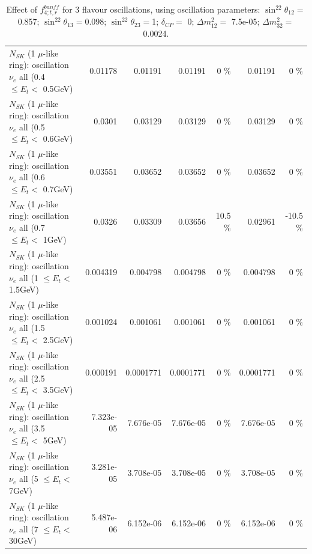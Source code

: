 \begin{table}
\begin{tabular}{| l | r | r | r  r | r  r |}
$N_{SK}$ (1 $\mu$-like ring): oscillation $\nu_{e}$ all (0.4 $\leq E_{t} <$ 0.5GeV) &         0.01178 &         0.01191 &         0.01191 &        0 \%  &         0.01191 &        0 \%  \\ 
$N_{SK}$ (1 $\mu$-like ring): oscillation $\nu_{e}$ all (0.5 $\leq E_{t} <$ 0.6GeV) &          0.0301 &         0.03129 &         0.03129 &        0 \%  &         0.03129 &        0 \%  \\ 
$N_{SK}$ (1 $\mu$-like ring): oscillation $\nu_{e}$ all (0.6 $\leq E_{t} <$ 0.7GeV) &         0.03551 &         0.03652 &         0.03652 &        0 \%  &         0.03652 &        0 \%  \\ 
$N_{SK}$ (1 $\mu$-like ring): oscillation $\nu_{e}$ all (0.7 $\leq E_{t} <$ 1GeV) &          0.0326 &         0.03309 &         0.03656 &     10.5 \%  &         0.02961 &    -10.5 \%  \\ 
$N_{SK}$ (1 $\mu$-like ring): oscillation $\nu_{e}$ all (1 $\leq E_{t} <$ 1.5GeV) &        0.004319 &        0.004798 &        0.004798 &        0 \%  &        0.004798 &        0 \%  \\ 
$N_{SK}$ (1 $\mu$-like ring): oscillation $\nu_{e}$ all (1.5 $\leq E_{t} <$ 2.5GeV) &        0.001024 &        0.001061 &        0.001061 &        0 \%  &        0.001061 &        0 \%  \\ 
$N_{SK}$ (1 $\mu$-like ring): oscillation $\nu_{e}$ all (2.5 $\leq E_{t} <$ 3.5GeV) &        0.000191 &       0.0001771 &       0.0001771 &        0 \%  &       0.0001771 &        0 \%  \\ 
$N_{SK}$ (1 $\mu$-like ring): oscillation $\nu_{e}$ all (3.5 $\leq E_{t} <$ 5GeV) &       7.323e-05 &       7.676e-05 &       7.676e-05 &        0 \%  &       7.676e-05 &        0 \%  \\ 
 $N_{SK}$ (1 $\mu$-like ring): oscillation $\nu_{e}$ all (5 $\leq E_{t} <$ 7GeV) &       3.281e-05 &       3.708e-05 &       3.708e-05 &        0 \%  &       3.708e-05 &        0 \%  \\ 
$N_{SK}$ (1 $\mu$-like ring): oscillation $\nu_{e}$ all (7 $\leq E_{t} <$ 30GeV) &       5.487e-06 &       6.152e-06 &       6.152e-06 &        0 \%  &       6.152e-06 &        0 \%  \\ 
\hline
\hline
\end{tabular}
\caption{ Effect of $f_{4; t, r}^{banff}$ for 3 flavour oscillations, using oscillation parameters:  $\sin^22\theta_{12} = $0.857; $\sin^22\theta_{13} = $0.098; $\sin^22\theta_{23} = $1; $\delta_{CP} = $        0; $\Delta m^2_{12} = $    7.5e-05; $\Delta m^2_{32} = $    0.0024. }
\label{tab:num_banff_04_1RmuT_3f_osc_t13:0.098}
\end{table}
